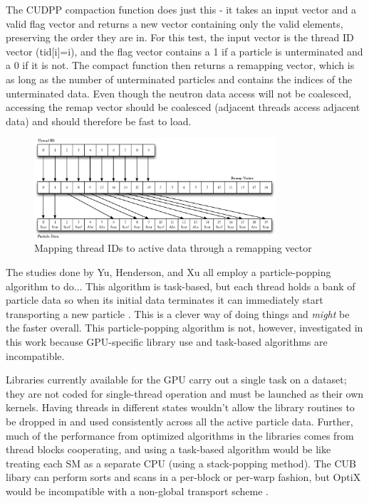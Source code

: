 The CUDPP compaction function does just this - it takes an input vector and a valid flag vector and returns a new vector containing only the valid elements, preserving the order they are in.  For this test, the input vector is the thread ID vector (tid[i]=i), and the flag vector contains a 1 if a particle is unterminated and a 0 if it is not.  The compact function then returns a remapping vector, which is as long as the number of unterminated particles and contains the indices of the unterminated data.  Even though the neutron data access will not be coalesced, accessing the remap vector should be coalesced (adjacent threads access adjacent data) and should therefore be fast to load.

\begin{figure}[h!] 
  \centering
    \includegraphics[width=0.8\textwidth]{graphics/remapping_horiz.eps}
     \caption{Mapping thread IDs to active data through a remapping vector \label{remapping} }
\end{figure}

The studies done by Yu, Henderson, and Xu all employ a particle-popping algorithm to do...  %
This algorithm is task-based, but each thread holds a bank of particle data so when its initial data terminates it can immediately start transporting a new particle \cite{tianyu, henderson, qixu}.  This is a clever way of doing things and \emph{might} be the faster overall. This particle-popping algorithm is not, however, investigated in this work because GPU-specific library use and task-based algorithms are incompatible. 

Libraries currently available for the GPU carry out a single task on a dataset; they are not coded for single-thread operation and must be launched as their own kernels.  Having threads in different states wouldn't allow the library routines to be dropped in and used consistently across all the active particle data.  Further, much of the performance from optimized algorithms in the libraries comes from thread blocks cooperating, and using a task-based algorithm would be like treating each SM as a separate CPU (using a stack-popping method).  The CUB libary can perform sorts and scans in a per-block or per-warp fashion, but OptiX would be incompatible with a non-global transport scheme \cite{optix}.

